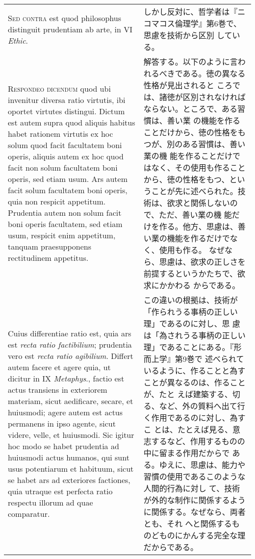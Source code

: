 \documentclass[10pt]{jsarticle}
\begin{document}
\begin{longtable}{p{21em}p{21em}}
{\scshape Sed contra} est quod philosophus distinguit prudentiam ab
 arte, in VI {\itshape Ethic}.

&

しかし反対に、哲学者は『ニコマコス倫理学』第6巻で、思慮を技術から区別
している。

\\

{\scshape Respondeo dicendum} quod ubi invenitur diversa ratio
virtutis, ibi oportet virtutes distingui. Dictum est autem supra quod
aliquis habitus habet rationem virtutis ex hoc solum quod facit
facultatem boni operis, aliquis autem ex hoc quod facit non solum
facultatem boni operis, sed etiam usum. Ars autem facit solum
facultatem boni operis, quia non respicit appetitum. Prudentia autem
non solum facit boni operis facultatem, sed etiam usum, respicit enim
appetitum, tanquam praesupponens rectitudinem appetitus.

&

解答する。以下のように言われるべきである。徳の異なる性格が見出されると
ころでは、諸徳が区別されなければならない。ところで、ある習慣は、善い業
の機能を作ることだけから、徳の性格をもつが、別のある習慣は、善い業の機
能を作ることだけではなく、その使用も作ることから、徳の性格をもつ、とい
うことが先に述べられた。技術は、欲求と関係しないので、ただ、善い業の機
能だけを作る。他方、思慮は、善い業の機能を作るだけでなく、使用も作る。
なぜなら、思慮は、欲求の正しさを前提するというかたちで、欲求にかかわる
からである。

\\

Cuius differentiae ratio est, quia ars est {\itshape recta ratio
factibilium}; prudentia vero est {\itshape recta ratio
agibilium}. Differt autem facere et agere quia, ut dicitur in IX
{\itshape Metaphys}., factio est actus transiens in exteriorem
materiam, sicut aedificare, secare, et huiusmodi; agere autem est
actus permanens in ipso agente, sicut videre, velle, et huiusmodi. Sic
igitur hoc modo se habet prudentia ad huiusmodi actus humanos, qui
sunt usus potentiarum et habituum, sicut se habet ars ad exteriores
factiones, quia utraque est perfecta ratio respectu illorum ad quae
comparatur.

&

この違いの根拠は、技術が「作られうる事柄の正しい理」であるのに対し、思
慮は「為されうる事柄の正しい理」であることにある。『形而上学』第9巻で
述べられているように、作ることと為すことが異なるのは、作ることが、たと
えば建築する、切る、など、外の質料へ出て行く作用であるのに対し、為すこ
とは、たとえば見る、意志するなど、作用するものの中に留まる作用だからで
ある。ゆえに、思慮は、能力や習慣の使用であるこのような人間的行為に対し
て、技術が外的な制作に関係するように関係する。なぜなら、両者とも、それ
へと関係するものどものにかんする完全な理だからである。


\end{longtable}
\end{document}
